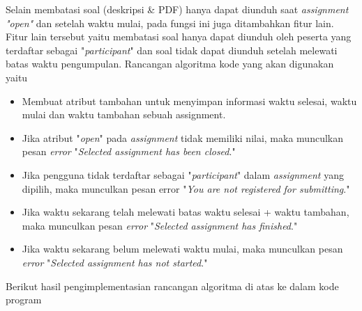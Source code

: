 Selain membatasi soal (deskripsi \& PDF) hanya dapat diunduh saat \textit{assignment "open"} dan setelah waktu mulai, pada fungsi ini juga ditambahkan fitur lain. Fitur lain tersebut yaitu membatasi soal hanya dapat diunduh oleh peserta yang terdaftar sebagai "\textit{participant}" dan soal tidak dapat diunduh setelah melewati batas waktu pengumpulan. Rancangan algoritma kode yang akan digunakan yaitu
\begin{itemize}
	\item Membuat atribut tambahan untuk menyimpan informasi waktu selesai, waktu mulai dan waktu tambahan sebuah assignment.
	\item Jika atribut "\textit{open}" pada \textit{assignment} tidak memiliki nilai, maka munculkan pesan \textit{error} "\textit{Selected assignment has been closed}."
	\item Jika pengguna tidak terdaftar sebagai "\textit{participant}" dalam \textit{assignment} yang dipilih, maka munculkan pesan error "\textit{You are not registered for submitting}."
	\item Jika waktu sekarang telah melewati batas waktu selesai + waktu tambahan, maka munculkan pesan \textit{error} "\textit{Selected assignment has finished}."
	\item Jika waktu sekarang belum melewati waktu mulai, maka munculkan pesan \textit{error} "\textit{Selected assignment has not started}."	
\end{itemize}

Berikut hasil pengimplementasian rancangan algoritma di atas ke dalam kode program

